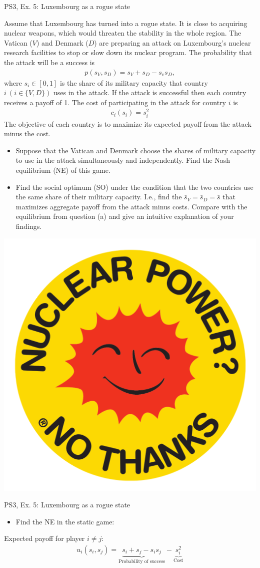 \begin{frame}{PS3, Ex. 5: Luxembourg as a rogue state}
  \begin{multicols}{2}
    Assume that Luxembourg has turned into a rogue state. It is close to acquiring nuclear weapons, which would threaten the stability in the whole region. The Vatican ($V$) and Denmark ($D$) are preparing an attack on Luxembourg’s nuclear research facilities to stop or slow down its nuclear program. The probability that the attack will be a success is
    \begin{align*}
      p(s_V,s_D)=s_V+s_D-s_vs_D,
    \end{align*}
    where $s_i\in[0,1]$ is the share of its military capacity that country $i\ (i\in\{V,D\})$ uses in the attack. If the attack is successful then each country receives a payoff of 1. The cost of participating in the attack for country $i$ is
    \begin{align*}
      c_i(s_i)=s_i^2
    \end{align*}
    The objective of each country is to maximize its expected payoff from the attack minus the cost.
  \vfill\null\columnbreak
    \begin{itemize}
      \item[(a)] Suppose that the Vatican and Denmark choose the shares of military capacity to use in the attack simultaneously and independently. Find the Nash equilibrium (NE) of this game.
      \item[(b)] Find the social optimum (SO) under the condition that the two countries use the same share of their military capacity. I.e., find the $\bar{s}_V=\bar{s}_D=\bar{s}$ that maximizes aggregate payoff from the attack minus costs. Compare with the equilibrium from question (a) and give an intuitive explanation of your findings.
    \end{itemize}
    \hfill \includegraphics[width=0.20 \textwidth]{figures/nuclear}
  \vfill\null
  \end{multicols}
\end{frame}
\begin{frame}{PS3, Ex. 5: Luxembourg as a rogue state}
  \begin{multicols}{2}
    \begin{itemize}
      \item[(a)] Find the NE in the static game:
    \end{itemize}
    Expected payoff for player $i\neq j$:
    \begin{align*}
      u_i(s_i,s_j)=\underbrace{s_i+s_j-s_is_j}_\text{Probability of success}-\underbrace{s_i^2}_\text{Cost}
    \end{align*}
  \vfill\null\columnbreak
  \vfill\null
  \end{multicols}
\end{frame}
